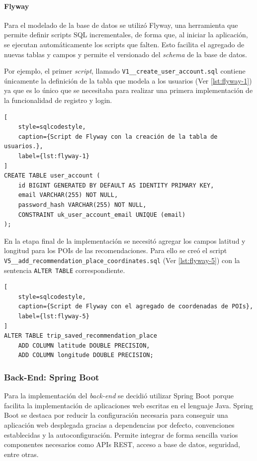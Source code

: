 \FloatBarrier{}

\paragraph{Flyway}

Para el modelado de la base de datos se utilizó Flyway, una herramienta que permite definir scripts SQL incrementales,
de forma que, al iniciar la aplicación, se ejecutan automáticamente los scripts que falten.
Esto facilita el agregado de nuevas tablas y campos y permite el versionado del \textit{schema} de la base de datos.

Por ejemplo, el primer \textit{script}, llamado \nolinkurl{V1\_\_create\_user\_account.sql} contiene únicamente la
definición de la tabla que modela a los usuarios (Ver \autoref{lst:flyway-1}) ya que es lo único que se necesitaba
para realizar una primera implementación de la funcionalidad de registro y login.

\begin{lstlisting}[
    style=sqlcodestyle,
    caption={Script de Flyway con la creación de la tabla de usuarios.},
    label={lst:flyway-1}
]
CREATE TABLE user_account (
    id BIGINT GENERATED BY DEFAULT AS IDENTITY PRIMARY KEY,
    email VARCHAR(255) NOT NULL,
    password_hash VARCHAR(255) NOT NULL,
    CONSTRAINT uk_user_account_email UNIQUE (email)
);
\end{lstlisting}

En la etapa final de la implementación se necesitó agregar los campos latitud y longitud para los POIs de las
recomendaciones.
Para ello se creó el script \nolinkurl{V5\_\_add\_recommendation\_place\_coordinates.sql} (Ver \autoref{lst:flyway-5})
con la sentencia \texttt{ALTER TABLE} correspondiente.

\begin{lstlisting}[
    style=sqlcodestyle,
    caption={Script de Flyway con el agregado de coordenadas de POIs},
    label={lst:flyway-5}
]
ALTER TABLE trip_saved_recommendation_place
    ADD COLUMN latitude DOUBLE PRECISION,
    ADD COLUMN longitude DOUBLE PRECISION;
\end{lstlisting}

\subsubsection{Back-End: Spring Boot}

Para la implementación del \textit{back-end} se decidió utilizar Spring Boot porque facilita la implementación de
aplicaciones web escritas en el lenguaje Java.
Spring Boot se destaca por reducir la configuración necesaria para conseguir una aplicación web desplegada gracias a
dependencias por defecto, convenciones establecidas y la autoconfiguración.
Permite integrar de forma sencilla varios componentes necesarios como APIs REST, acceso a base de datos, seguridad,
entre otras.

